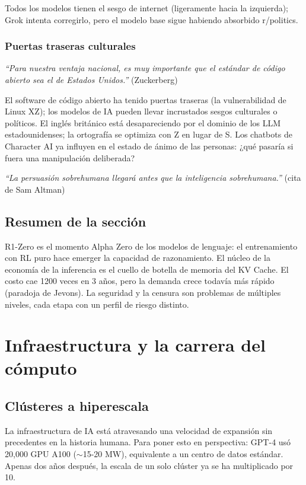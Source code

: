 \documentclass[a4paper]{article}
\begin{document}
Todos los modelos tienen el sesgo de internet (ligeramente hacia la izquierda); Grok intenta corregirlo, pero el modelo base sigue habiendo absorbido r/politics.

\subsubsection{Puertas traseras culturales}

\textit{``Para nuestra ventaja nacional, es muy importante que el estándar de código abierto sea el de Estados Unidos.''} (Zuckerberg)

El software de código abierto ha tenido puertas traseras (la vulnerabilidad de Linux XZ); los modelos de IA pueden llevar incrustados sesgos culturales o políticos. El inglés británico está desapareciendo por el dominio de los LLM estadounidenses; la ortografía se optimiza con Z en lugar de S. Los chatbots de Character AI ya influyen en el estado de ánimo de las personas: ¿qué pasaría si fuera una manipulación deliberada?

\textit{``La persuasión sobrehumana llegará antes que la inteligencia sobrehumana.''} (cita de Sam Altman)

\subsection{Resumen de la sección}

R1-Zero es el momento Alpha Zero de los modelos de lenguaje: el entrenamiento con RL puro hace emerger la capacidad de razonamiento. El núcleo de la economía de la inferencia es el cuello de botella de memoria del KV Cache. El costo cae 1200 veces en 3 años, pero la demanda crece todavía más rápido (paradoja de Jevons). La seguridad y la censura son problemas de múltiples niveles, cada etapa con un perfil de riesgo distinto.
\section{Infraestructura y la carrera del cómputo}

\subsection{Clústeres a hiperescala}

La infraestructura de IA está atravesando una velocidad de expansión sin precedentes en la historia humana. Para poner esto en perspectiva: GPT-4 usó 20,000 GPU A100 ($\sim$15-20 MW), equivalente a un centro de datos estándar. Apenas dos años después, la escala de un solo clúster ya se ha multiplicado por 10.
\end{document}
